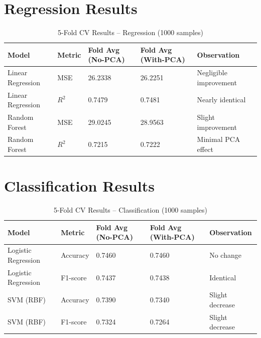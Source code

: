 \documentclass[11pt]{article}
\begin{document}
\section*{Regression Results}

\begin{table}[H]
\centering
\caption{5-Fold CV Results -- Regression (1000 samples)}
\begin{tabularx}{\textwidth}{|X|X|X|X|X|}
\hline
\textbf{Model} & \textbf{Metric} & \textbf{Fold Avg (No-PCA)} & \textbf{Fold Avg (With-PCA)} & \textbf{Observation} \\
\hline
Linear Regression & MSE & 26.2338 & 26.2251 & Negligible improvement \\
Linear Regression & $R^2$ & 0.7479 & 0.7481 & Nearly identical \\
Random Forest & MSE & 29.0245 & 28.9563 & Slight improvement \\
Random Forest & $R^2$ & 0.7215 & 0.7222 & Minimal PCA effect \\
\hline
\end{tabularx}
\end{table}

\section*{Classification Results}

\begin{table}[H]
\centering
\caption{5-Fold CV Results -- Classification (1000 samples)}
\begin{tabularx}{\textwidth}{|X|X|X|X|X|}
\hline
\textbf{Model} & \textbf{Metric} & \textbf{Fold Avg (No-PCA)} & \textbf{Fold Avg (With-PCA)} & \textbf{Observation} \\
\hline
Logistic Regression & Accuracy & 0.7460 & 0.7460 & No change \\
Logistic Regression & F1-score  & 0.7437 & 0.7438 & Identical \\
SVM (RBF) & Accuracy & 0.7390 & 0.7340 & Slight decrease \\
SVM (RBF) & F1-score  & 0.7324 & 0.7264 & Slight decrease \\
\hline
\end{tabularx}
\end{table}
\end{document}
